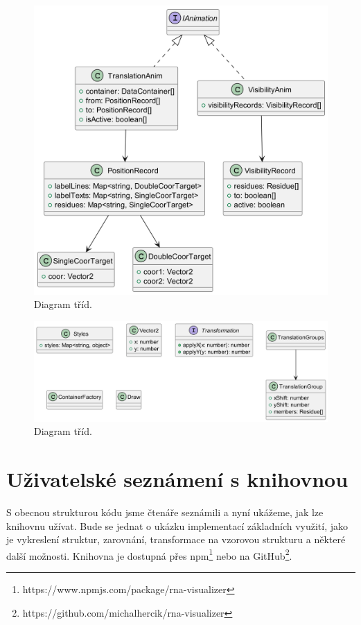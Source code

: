 \begin{figure}[H]
  \centering
  \includegraphics[width=145mm]{../img/kap03/animation.png}
  \caption[Diagram tříd]{Diagram tříd.}
  \label{diagram2}
\end{figure}

\begin{figure}[H]
  \centering
  \includegraphics[width=145mm]{../img/kap03/others.png}
  \caption[Diagram tříd]{Diagram tříd.}
  \label{diagram3}
\end{figure}

\section{Uživatelské seznámení s knihovnou} \label{seznameni}

S obecnou strukturou kódu jsme čtenáře seznámili a nyní ukážeme, jak lze
knihovnu užívat. Bude se jednat o ukázku implementací základních využití, jako
je vykreslení struktur, zarovnání, transformace na vzorovou strukturu a některé
další možnosti. Knihovna je dostupná přes
npm\footnote{https://www.npmjs.com/package/rna-visualizer} nebo na
GitHub\footnote{https://github.com/michalhercik/rna-visualizer}.

